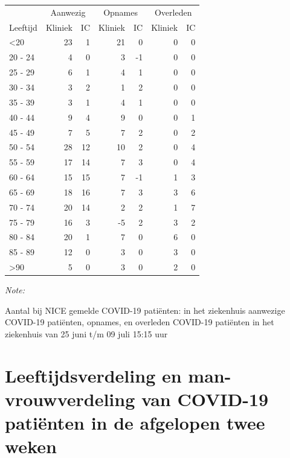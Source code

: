 \documentclass[
  english,
  man,floatsintext]{apa6}
\begin{document}
\begin{table}
\centering\begingroup\fontsize{10}{12}\selectfont

\begin{threeparttable}
\begin{tabular}{lrrrrrr}
\toprule
\multicolumn{1}{c}{ } & \multicolumn{2}{c}{Aanwezig} & \multicolumn{2}{c}{Opnames} & \multicolumn{2}{c}{Overleden} \\
\cmidrule(l{3pt}r{3pt}){2-3} \cmidrule(l{3pt}r{3pt}){4-5} \cmidrule(l{3pt}r{3pt}){6-7}
Leeftijd & Kliniek & IC & Kliniek & IC & Kliniek & IC\\
\midrule
<20 & 23 & 1 & 21 & 0 & 0 & 0\\
20 - 24 & 4 & 0 & 3 & -1 & 0 & 0\\
25 - 29 & 6 & 1 & 4 & 1 & 0 & 0\\
30 - 34 & 3 & 2 & 1 & 2 & 0 & 0\\
35 - 39 & 3 & 1 & 4 & 1 & 0 & 0\\
40 - 44 & 9 & 4 & 9 & 0 & 0 & 1\\
45 - 49 & 7 & 5 & 7 & 2 & 0 & 2\\
50 - 54 & 28 & 12 & 10 & 2 & 0 & 4\\
55 - 59 & 17 & 14 & 7 & 3 & 0 & 4\\
60 - 64 & 15 & 15 & 7 & -1 & 1 & 3\\
65 - 69 & 18 & 16 & 7 & 3 & 3 & 6\\
70 - 74 & 20 & 14 & 2 & 2 & 1 & 7\\
75 - 79 & 16 & 3 & -5 & 2 & 3 & 2\\
80 - 84 & 20 & 1 & 7 & 0 & 6 & 0\\
85 - 89 & 12 & 0 & 3 & 0 & 3 & 0\\
>90 & 5 & 0 & 3 & 0 & 2 & 0\\
\bottomrule
\end{tabular}
\begin{tablenotes}
\item \textit{Note: } 
\item Aantal bij NICE gemelde COVID-19 patiënten: in het ziekenhuis aanwezige COVID-19 patiënten, opnames, en overleden COVID-19 patiënten in het ziekenhuis van 25 juni t/m 09 juli 15:15 uur
\end{tablenotes}
\end{threeparttable}
\endgroup{}
\end{table}

\newpage

\hypertarget{leeftijdsverdeling-en-man-vrouwverdeling-van-covid-19-patiuxebnten-in-de-afgelopen-twee-weken}{%
\section{Leeftijdsverdeling en man-vrouwverdeling van COVID-19 patiënten in de afgelopen twee weken}\label{leeftijdsverdeling-en-man-vrouwverdeling-van-covid-19-patiuxebnten-in-de-afgelopen-twee-weken}}
\end{document}
